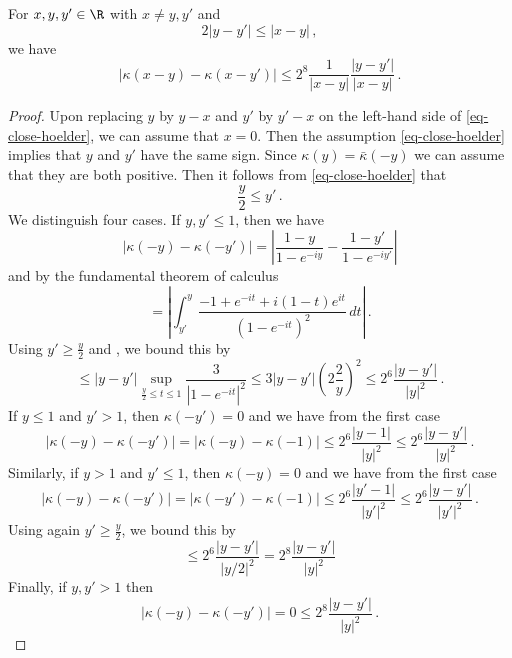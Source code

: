 \begin{lemma}
\label{Hilbert-kernel-regularity}
\leanok
{}
    For $x,y,y'\in \R$ with $x\neq y,y'$ and
    \begin{equation}
        \label{eq-close-hoelder}
        2|y-y'|\le |x-y|\, ,
    \end{equation}
    we have
    \begin{equation}\label{eqcarl301}
        |\kappa(x-y) - \kappa(x-y')|\le 2^{8}\frac{1}{|x-y|} \frac{|y-y'|}{|x-y|}\, .
    \end{equation}
\end{lemma}

\begin{proof}
\leanok
    Upon replacing $y$ by $y-x$ and $y'$ by $y'-x$ on the left-hand side of \eqref{eq-close-hoelder}, we can assume that $x = 0$. Then the assumption \eqref{eq-close-hoelder} implies that $y$ and $y'$ have the same sign. Since $\kappa(y) = \bar \kappa(-y)$ we can assume that they are both positive. Then it follows from \eqref{eq-close-hoelder} that
    $$
        \frac{y}{2} \le y' \,.
    $$
    We distinguish four cases. If $y, y' \le 1$, then we have
    $$
        |\kappa(-y) - \kappa(-y')| = \left| \frac{1 - y}{1- e^{-iy}} - \frac{1 - y'}{1- e^{-iy'}}\right|
    $$
    and by the fundamental theorem of calculus
    $$
        = \left| \int_{y'}^{y} \frac{-1 + e^{-it} + i(1-t)e^{it}}{(1 - e^{-it})^2} \,dt \right|\,.
    $$
    Using $y' \ge \frac{y}{2}$ and , we bound this by
    $$
        \le |y - y'| \sup_{\frac{y}{2} \le t \le 1} \frac{3}{|1 - e^{-it}|^2} \le 3 |y-y'| (2 \frac{2}{y})^2 \le 2^{6} \frac{|y-y'|}{|y|^2}\,.
    $$
    If $y \le 1$ and $y' > 1$, then $\kappa(-y') = 0$ and we have from the first case
    $$
        |\kappa(-y) - \kappa(-y')| = |\kappa(-y) - \kappa(-1)| \le 2^{6} \frac{|y-1|}{|y|^2} \le 2^{6} \frac{|y-y'|}{|y|^2}\,.
    $$
    Similarly, if $y > 1$ and $y' \le 1$, then $\kappa(-y) = 0$ and we have from the first case
    $$
        |\kappa(-y) - \kappa(-y')| = |\kappa(-y') - \kappa(-1)| \le 2^{6} \frac{|y'-1|}{|y'|^2} \le 2^{6} \frac{|y-y'|}{|y'|^2}\,.
    $$
    Using again $y' \ge \frac{y}{2}$, we bound this by
    $$
        \le 2^{6} \frac{|y-y'|}{|y / 2|^2} = 2^{8} \frac{|y-y'|}{|y|^2}
    $$
    Finally, if $y, y' > 1$ then
    $$
        |\kappa(-y) - \kappa(-y')| = 0 \le 2^{8} \frac{|y-y'|}{|y|^2}\,.
    $$
\end{proof}






